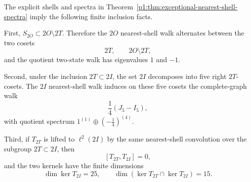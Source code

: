 \documentclass[11pt]{article}
\begin{document}
\begin{corollary}
\label{p1:cor:nearest-shell-inclusion-consequences}
The explicit shells and spectra in
Theorem~\ref{p1:thm:exceptional-nearest-shell-spectra} imply the following
finite inclusion facts.

First, \(S_{2O}\subset 2O\setminus2T\).  Therefore the \(2O\) nearest-shell walk
alternates between the two cosets
\[
    2T,\qquad 2O\setminus2T,
\]
and the quotient two-state walk has eigenvalues \(1\) and \(-1\).

Second, under the inclusion \(2T\subset2I\), the set \(2I\) decomposes into five
right \(2T\)-cosets.  The \(2I\) nearest-shell walk induces on these five cosets the
complete-graph walk
\[
    \frac14(J_5-I_5),
\]
with quotient spectrum \(1^{(1)}\oplus(-\frac14)^{(4)}\).

Third, if \(T_{2T}\) is lifted to \(\ell^2(2I)\) by the same nearest-shell
convolution over the subgroup \(2T\subset2I\), then
\[
    [T_{2T},T_{2I}]=0,
\]
and the two kernels have the finite dimensions
\[
    \dim\ker T_{2I}=25,\qquad
    \dim(\ker T_{2T}\cap\ker T_{2I})=15.
\]
\end{corollary}
\end{document}
